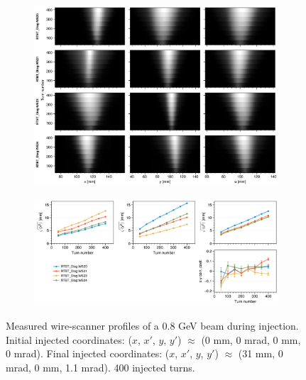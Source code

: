 \begin{figure}[!p]
    \centering
    \begin{subfigure}{\textwidth}
        \includegraphics[width=\textwidth]{Images/chapter5/exp3/waterfall.png}
    \end{subfigure}
    \vfill
    \vspace*{1.25cm}
    \vfill
    \begin{subfigure}{\textwidth}
        \includegraphics[width=\textwidth]{Images/chapter5/exp3/rms.png}
    \end{subfigure}
    \caption{Measured wire-scanner profiles of a 0.8 GeV beam during injection. Initial injected coordinates: ($x$, $x'$, $y$, $y'$) $\approx$ (0 mm, 0 mrad, 0 mm, 0 mrad). Final injected coordinates: ($x$, $x'$, $y$, $y'$) $\approx$ (31 mm, 0 mrad, 0 mm, 1.1 mrad). 400 injected turns.}
    \label{fig:exp3_wsmeas}
\end{figure}
%
%
